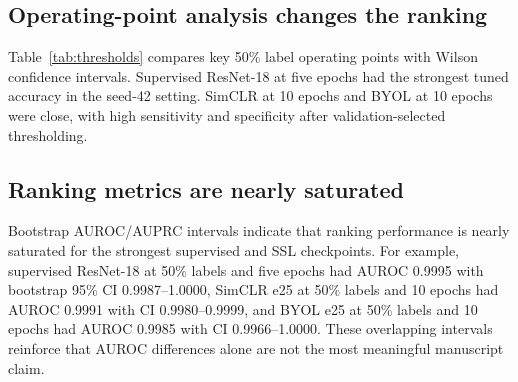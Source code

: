 \documentclass[pdflatex,sn-mathphys-num]{sn-jnl}
\theoremstyle{thmstyleone}
\theoremstyle{thmstyletwo}
\theoremstyle{thmstylethree}
\begin{document}
\subsection{Operating-point analysis changes the ranking}\label{subsec:op_results}

Table~\ref{tab:thresholds} compares key 50\% label operating points with Wilson confidence intervals. Supervised ResNet-18 at five epochs had the strongest tuned accuracy in the seed-42 setting. SimCLR at 10 epochs and BYOL at 10 epochs were close, with high sensitivity and specificity after validation-selected thresholding.

\begin{table}[t]
\caption{Key 50\% label validation-selected operating points with Wilson 95\% confidence intervals. Thresholds were selected on validation predictions and locked before test evaluation.}\label{tab:thresholds}
\end{table}

\subsection{Ranking metrics are nearly saturated}\label{subsec:bootstrap_results}

Bootstrap AUROC/AUPRC intervals indicate that ranking performance is nearly saturated for the strongest supervised and SSL checkpoints. For example, supervised ResNet-18 at 50\% labels and five epochs had AUROC 0.9995 with bootstrap 95\% CI 0.9987--1.0000, SimCLR e25 at 50\% labels and 10 epochs had AUROC 0.9991 with CI 0.9980--0.9999, and BYOL e25 at 50\% labels and 10 epochs had AUROC 0.9985 with CI 0.9966--1.0000. These overlapping intervals reinforce that AUROC differences alone are not the most meaningful manuscript claim.
\end{document}
